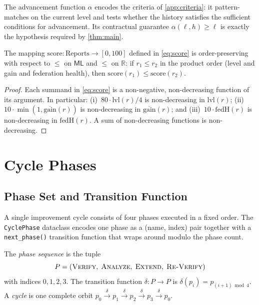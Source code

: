 \documentclass[11pt]{article}
\newcommand{\ML}{\mathsf{ML}}               %
\newcommand{\lvl}{\mathrm{lvl}}             %
\newcommand{\gain}{\mathrm{gain}}           %
\newcommand{\score}{\mathrm{score}}         %
\newcommand{\fedH}{\mathrm{fedH}}           %
\newcommand{\Verify}{\textsc{Verify}}
\newcommand{\Analyze}{\textsc{Analyze}}
\newcommand{\Extend}{\textsc{Extend}}
\newcommand{\ReVerify}{\textsc{Re-Verify}}
\begin{document}
The advancement function $\alpha$ encodes the criteria of
\cref{app:criteria}: it pattern-matches on the current level and tests
whether the history satisfies the sufficient conditions for advancement.
Its contractual guarantee $\alpha(\ell, h) \geq \ell$ is exactly the
hypothesis required by \cref{thm:main}.

\begin{proposition}\label{prop:homo}
The mapping $\score : \mathrm{Reports} \to [0, 100]$ defined in
\cref{eq:score} is order-preserving with respect to $\leq$ on $\ML$ and
$\leq$ on $\mathbb{R}$: if $r_1 \leq r_2$ in the product order
(level and gain and federation health), then
$\score(r_1) \leq \score(r_2)$.
\end{proposition}
\begin{proof}
Each summand in \cref{eq:score} is a non-negative, non-decreasing function
of its argument.  In particular:
(i)~$80 \cdot \lvl(r)/4$ is non-decreasing in $\lvl(r)$;
(ii)~$10 \cdot \min(1, \overline{\gain}(r))$ is non-decreasing in
$\overline{\gain}(r)$; and
(iii)~$10 \cdot \fedH(r)$ is non-decreasing in $\fedH(r)$.
A sum of non-decreasing functions is non-decreasing.
\end{proof}

\section{Cycle Phases}\label{sec:phases}

\subsection{Phase Set and Transition Function}

A single improvement cycle consists of four phases executed in a fixed
order.  The \texttt{CyclePhase} dataclass encodes one phase as a
(name, index) pair together with a \texttt{next\_phase()} transition
function that wraps around modulo the phase count.

\begin{definition}\label{def:phases}
The \emph{phase sequence} is the tuple
\[
  P = (\Verify,\; \Analyze,\; \Extend,\; \ReVerify)
\]
with indices $0,1,2,3$.  The transition function
$\delta : P \to P$ is $\delta(p_i) = p_{(i+1) \bmod 4}$.
A \emph{cycle} is one complete orbit $p_0 \xrightarrow{\delta}
p_1 \xrightarrow{\delta} p_2 \xrightarrow{\delta} p_3
\xrightarrow{\delta} p_0$.
\end{definition}
\end{document}
